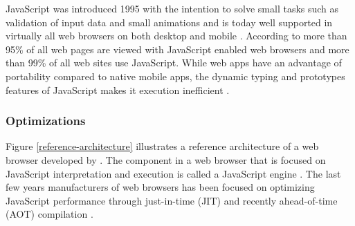 JavaScript was introduced 1995 with the intention to solve small tasks such as validation of input data and small animations \parencite{Moller2018} and is today well supported in virtually all web browsers on both desktop and mobile \parencite{Zakai2011}. According to \textcite{TiwariSolihin2012} more than 95\% of all web pages are viewed with JavaScript enabled web browsers and more than 99\% of all web sites use JavaScript. While web apps have an advantage of portability compared to native mobile apps, the dynamic typing and prototypes features of JavaScript makes it execution inefficient \parencite{ParkJungMoon2015}.

\subsubsection*{Optimizations}

Figure \ref{reference-architecture} illustrates a reference architecture of a web browser developed by \textcite{GrosskurthGodfrey2005}. The component in a web browser that is focused on JavaScript interpretation and execution is called a JavaScript engine \parencite{JeonChoi2012}. The last few years manufacturers of web browsers has been focused on optimizing JavaScript performance through just-in-time (JIT) and recently ahead-of-time (AOT) compilation \parencite{HerreraChenLavoieHendren2018}.

\begin{comment}

\begin{figure}[!h]
\centering
\texttt{[image: ../Figures/reference-architecture]}
\caption{Web browser reference architecture. Adapted from \textcite{GrosskurthGodfrey2005}.}
\label{reference-architecture}
\end{figure}
    
\begin{figure}[!h]
\centering
\texttt{[image: ../Figures/javascript-optimization]}
\caption{JavaScript execution tiers. Adapted from \textcite{ParkKimMoon2017,ZhuykovVardanyanMelnikBuchatskiySharygin2015}.}
\label{javascript-optimization}
\end{figure}
    
\end{comment}


